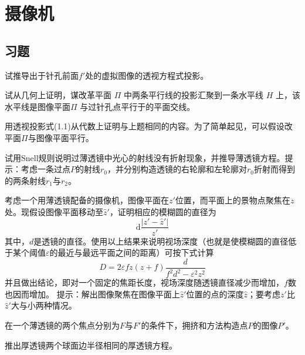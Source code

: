 
\section{摄像机}

\subsection{习题}

\begin{problem}
    试推导出于针孔前面$f'$处的虚拟图像的透视方程式投影。
\end{problem}

\begin{problem}
    试从几何上证明，谋改革平面 $\Pi$ 中两条平行线的投影汇聚到一条水平线 $H$ 上，该水平线是图像平面$\Pi$ 与过针孔点平行于的平面交线。
\end{problem}

\begin{problem}
    用透视投影式(1.1)从代数上证明与上题相同的内容。为了简单起见，可以假设改平面$\Pi$与图像平面平行。
\end{problem}

\begin{problem}
    试用Snell规则说明过薄透镜中光心的射线没有折射现象，并推导薄透镜方程。提示：考虑一条过点$P$的射线$r_0$，并分别构造透镜的右轮廓和左轮廓对$r_0$折射而得到的两条射线$r_1$与$r_2$。
\end{problem}

\begin{problem}
    考虑一个用薄透镜配备的摄像机，图像平面在$z'$位置，而平面上的景物点聚焦在$z$处。现假设图像平面移动至$\hat{z} '$，证明相应的模糊圆的直径为
    $$\mathrm{d}\frac{\left | z' - \hat{z}'  \right | }{z'}  $$
    其中，$d$是透镜的直径。使用以上结果来说明视场深度（也就是使模糊圆的直径低于某个阈值$\varepsilon$的最近与最远平面之间的距离）可按下式计算
    $$ D=2\varepsilon fz(z+f)\frac{d}{f^2d^2-\varepsilon ^2z^2} $$
    并且做出结论，即对一个固定的焦距长度，视场深度随透镜直径减少而增加，$f$数也因而增加。
    提示：解出图像聚焦在图像平面上$\hat{z}'$位置的点的深度$\hat{z}$；要考虑$z'$比$\hat{z}'$大与小两种情况。
\end{problem}

\begin{problem}
    在一个薄透镜的两个焦点分别为$F$与$F'$的条件下，拥挤和方法构造点$P$的图像$P'$。
\end{problem}

\begin{problem}
    推出厚透镜两个球面边半径相同的厚透镜方程。
\end{problem}